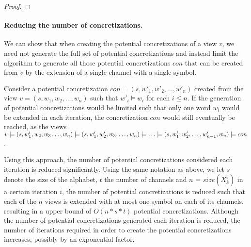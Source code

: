 \begin{proof}
\end{proof}


\paragraph{Reducing the number of concretizations.}
We can show that when creating the potential concretizations of a view $v$, we need not generate the full set of potential concretizations and instead limit the algorithm to generate all those potential concretizations $con$ that can be created from $v$ by the extension of a single channel with a single symbol.

Consider a potential concretization $con = (s, w'_1, w'_2, \ldots, w'_n)$ created from the view $v = (s, w_1, w_2, \ldots, w_n)$ such that $w'_i \models w_i$ for each $i \leq n$. If the generation of potential concretizations would be limited such that only one word $w_i$ would be extended in each iteration, the concretization $con$ would still eventually be reached, as the views $v \models (s, w'_1, w_2, w_3 \ldots, w_n) \models (s, w'_1, w'_2, w_3, \ldots, w_n) \models \ldots \models (s, w'_1, w'_2, \ldots, w'_{n-1}, w_n) \models con$.

Using this approach, the number of potential concretizations considered each iteration is reduced significantly. Using the same notation as above, we let $s$ denote the size of the alphabet, $t$ the number of channels and $n$ = $size(X_k^i)$ in a certain iteration $i$, the number of potential concretizations is reduced such that each of the $n$ views is extended with at most one symbol on each of its channels, resulting in a upper bound of $O(n*s*t)$ potential concretizations. Although the number of potential concretizations generated each iteration is reduced, the number of iterations required in order to create the potential concretizations increases, possibly by an exponential factor.

